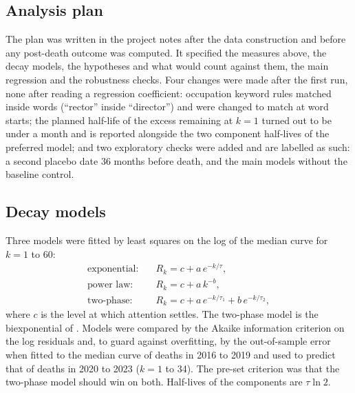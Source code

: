 \documentclass[11pt,a4paper]{article}
\begin{document}
\subsection{Analysis plan}
The plan was written in the project notes after the data construction and before any post-death outcome was computed. It specified the measures above, the decay models, the hypotheses and what would count against them, the main regression and the robustness checks. Four changes were made after the first run, none after reading a regression coefficient: occupation keyword rules matched inside words (``rector'' inside ``director'') and were changed to match at word starts; the planned half-life of the excess remaining at $k = 1$ turned out to be under a month and is reported alongside the two component half-lives of the preferred model; and two exploratory checks were added and are labelled as such: a second placebo date 36 months before death, and the main models without the baseline control.

\subsection{Decay models}
Three models were fitted by least squares on the log of the median curve for $k = 1$ to 60:
\begin{align*}
\text{exponential:}\quad & R_k = c + a\,e^{-k/\tau},\\
\text{power law:}\quad & R_k = c + a\,k^{-b},\\
\text{two-phase:}\quad & R_k = c + a\,e^{-k/\tau_1} + b\,e^{-k/\tau_2},
\end{align*}
where $c$ is the level at which attention settles. The two-phase model is the biexponential of \citet{candia2019}. Models were compared by the Akaike information criterion on the log residuals and, to guard against overfitting, by the out-of-sample error when fitted to the median curve of deaths in 2016 to 2019 and used to predict that of deaths in 2020 to 2023 ($k = 1$ to 34). The pre-set criterion was that the two-phase model should win on both. Half-lives of the components are $\tau \ln 2$.
\end{document}
